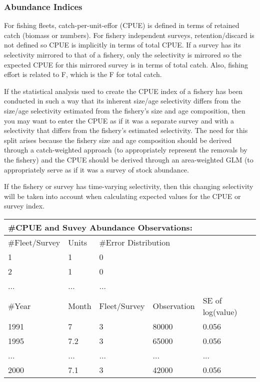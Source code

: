 \subsubsection{Abundance Indices}
For fishing fleets, catch-per-unit-effor (CPUE) is defined in terms of retained catch (biomass or numbers).  For fishery independent surveys, retention/discard is not defined so CPUE is implicitly in terms of total CPUE.  If a survey has its selectivity mirrored to that of a fishery, only the selectivity is mirrored so the expected CPUE for this mirrored survey is in terms of total catch.  Also, fishing effort is related to F, which is the F for total catch.

If the statistical analysis used to create the CPUE index of a fishery has been conducted in such a way that its inherent size/age selectivity differs from the size/age selectivity estimated from the fishery’s size and age composition, then you may want to enter the CPUE as if it was a separate survey and with a selectivity that differs from the fishery’s estimated selectivity.  The need for this split arises because the fishery size and age composition should be derived through a catch-weighted approach (to appropriately represent the removals by the fishery) and the CPUE should be derived through an area-weighted GLM (to appropriately serve as if it was a survey of stock abundance.

If the fishery or survey has time-varying selectivity, then this changing selectivity will be taken into account when calculating expected values for the CPUE or survey index.


\begin{center}
	\begin{tabular}{p{3cm} p{2cm} p{3cm} p{3cm} p{3cm}}
		\multicolumn{5}{l}{\#CPUE and Suvey Abundance Observations:}\\
		\hline
		\#Fleet/Survey & Units & \multicolumn{3}{l}{\#Error Distribution}\\
		\hline
		1 & 1 & \multicolumn{3}{l}{0}\\
		2 & 1 & \multicolumn{3}{l}{0}\\
		... & ... & \multicolumn{3}{l}{...}\\
		\hline
		\#Year & Month & Fleet/Survey & Observation & SE of log(value) \\
		\hline
		1991 & 7   & 3   & 80000 & 0.056 \\
		1995 & 7.2 & 3   & 65000 & 0.056 \\
		...  & ... & ... & ...   & ... \\
		2000 & 7.1 & 3   & 42000 & 0.056 \\
		\hline
	\end{tabular}
\end{center}

